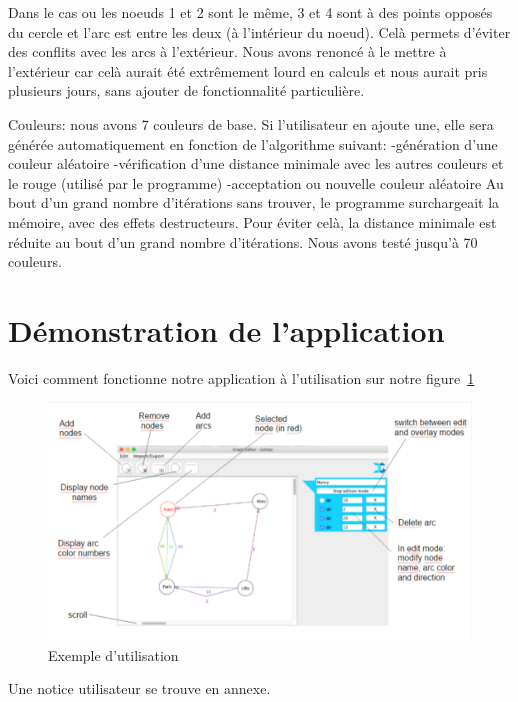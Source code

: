 \documentclass[pidr]{tnreport}
\begin{document}
Dans le cas ou les noeuds 1 et 2 sont le même, 3 et 4 sont à des points opposés du cercle et l’arc est entre les deux (à l’intérieur du noeud). Celà permets d’éviter des conflits avec les arcs à l’extérieur. Nous avons renoncé à le mettre à l’extérieur car celà aurait été extrêmement lourd en calculs et nous aurait pris plusieurs jours, sans ajouter de fonctionnalité particulière.

Couleurs: nous avons 7 couleurs de base. Si l’utilisateur en ajoute une, elle sera générée automatiquement en fonction de l’algorithme suivant:
-génération d’une couleur aléatoire
-vérification d’une distance minimale avec les autres couleurs et le rouge (utilisé par le programme)
-acceptation ou nouvelle couleur aléatoire
Au bout d’un grand nombre d’itérations sans trouver, le programme surchargeait la mémoire, avec des effets destructeurs. Pour éviter celà, la distance minimale est réduite au bout d’un grand nombre d’itérations. Nous avons testé jusqu’à 70 couleurs.

\clearpage

\section{Démonstration de l'application}

Voici comment fonctionne notre application à l’utilisation sur notre figure~\ref{fig:utilisation_application}

\begin{figure}[h]
  \centering
  \includegraphics[width=17cm]{figures/exemples/utilisation_application}
  \caption{Exemple d'utilisation}
  \label{fig:utilisation_application}
\end{figure}

Une notice utilisateur se trouve en annexe.
\end{document}
